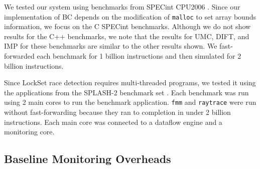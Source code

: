 We tested our system using benchmarks from SPECint
CPU2006 \cite{spec2006}. Since our implementation of BC depends on the
modification of {\tt malloc} to set array bounds information, we focus on the C
SPECint benchmarks. Although we do not
show results for the C++ benchmarks, we note that the results for UMC, DIFT, and IMP
for these benchmarks are similar to the other results shown.
We fast-forwarded each benchmark for 1 billion instructions and then simulated for 2 billion instructions. 

Since LockSet race detection requires multi-threaded programs, we tested it using
the applications from the SPLASH-2 benchmark set \cite{splash-isca95}. 
Each benchmark was run using 2 main cores to run the benchmark application.
{\tt fmm} and {\tt raytrace} were run without fast-forwarding because they ran to completion in under 2 billion instructions.
Each main core was connected to a dataflow engine and a monitoring core.

\subsection{Baseline Monitoring Overheads}



